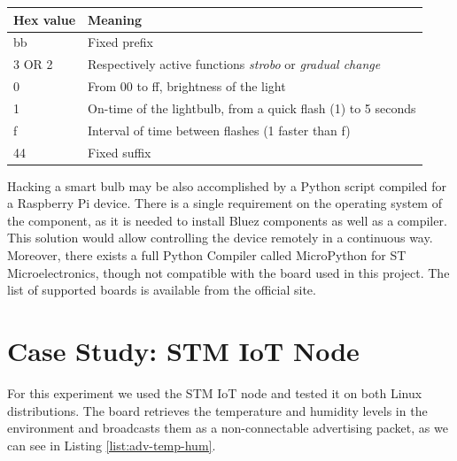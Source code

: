 \begin{minipage}{\linewidth}
	\centering
	 \label{tab:light-blebulb}
	\begin{tabular}{l l} 
		\hline
		Hex value &	Meaning  \\ \hline
		bb &	Fixed prefix  \\ 
		3 OR 2 &	Respectively active functions \textit{strobo} or \textit{gradual change} \\ 
		0 &	From 00 to ff, brightness of the light \\ 
		1 &	On-time of the lightbulb, from a quick flash (1) to 5 seconds \\ 
		f & Interval of time between flashes (1 faster than f)  \\ 
		44 & Fixed suffix  \\
		\end {tabular}\par
		\bigskip
\end{minipage}

Hacking a smart bulb may be also accomplished by a Python script compiled for a Raspberry Pi device. There is a single requirement on the operating system of the component, as it is needed to install Bluez components as well as a compiler. This solution would allow controlling the device remotely in a continuous way. Moreover, there exists a full Python Compiler called MicroPython for ST Microelectronics, though not compatible with the board used in this project. The list of supported boards is available from the official site.

\section{Case Study: STM IoT Node} 
For this experiment we used the STM IoT node and tested it on both Linux distributions. The board retrieves the temperature and humidity levels in the environment and broadcasts them as a non-connectable advertising packet, as we can see in Listing \ref{list:adv-temp-hum}.


